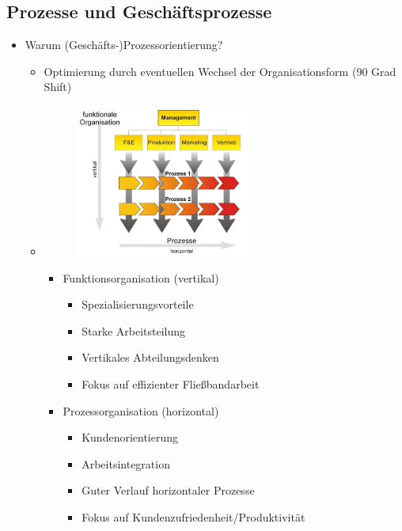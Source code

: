 \documentclass[11pt,a4paper]{article}
\begin{document}
\subsection{Prozesse und Geschäftsprozesse}
\begin{itemize}

\item Warum (Geschäfts-)Prozessorientierung?
	\begin{itemize}
		\item Optimierung durch eventuellen Wechsel der Organisationsform (90 Grad Shift)	
		\item[] 
		\vspace{0.3cm}
			\begin{minipage}{0.3\textwidth}
				\begin{figure}[H]
				\includegraphics[height=5cm]{vertical_horizontal}
				\end{figure}
			\end{minipage}
			\begin{minipage}[t]{0.6\textwidth}
				\vspace{-3cm}
				\begin{itemize}
				\item Funktionsorganisation (vertikal)
					\begin{itemize}
					\item Spezialisierungsvorteile
					\item Starke Arbeitsteilung
					\item Vertikales Abteilungsdenken
					\item Fokus auf effizienter Fließbandarbeit
					\end{itemize}					 
				
				\item Prozessorganisation (horizontal)
					\begin{itemize}
					\item Kundenorientierung 
					\item Arbeitsintegration
					\item Guter Verlauf horizontaler Prozesse
					\item Fokus auf Kundenzufriedenheit/Produktivität
					\end{itemize}
				\end{itemize}
			\end{minipage}
			

\end{itemize}
\end{itemize}
\end{document}
